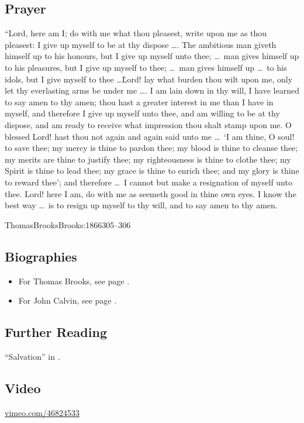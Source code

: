 \documentclass[00-main.tex]{subfiles}
\begin{document}
\subsection{Prayer}
``Lord, here am I; do with me what thou pleasest, write upon me as thou pleasest: I give up myself to be at thy dispose \dots. The ambitious man giveth himself up to his honours, but I give up myself unto thee; \dots\ man gives himself up to his pleasures, but I give up myself to thee; \dots\ man gives himself up \dots\ to his idols, but I give myself to thee \dots\. Lord! lay what burden thou wilt upon me, only let thy everlasting arms be under me \dots. I am lain down in thy will, I have learned to say amen to thy amen; thou hast a greater interest in me than I have in myself, and therefore I give up myself unto thee, and am willing to be at thy dispose, and am ready to receive what impression thou shalt stamp upon me. O blessed Lord! hast thou not again and again said unto me \dots\ `I am thine, O soul! to save thee; my mercy is thine to pardon thee; my blood is thine to cleanse thee; my merits are thine to justify thee; my righteousness is thine to clothe thee; my Spirit is thine to lead thee; my grace is thine to enrich thee; and my glory is thine to reward thee'; and therefore \dots\ I cannot but make a resignation of myself unto thee. Lord! here I am, do with me as seemeth good in thine own eyes. I know the best way \dots\ is to resign up myself to thy will, and to say amen to thy amen.

\begin{NameCite}{Thomas}{Brooks}{Brooks:1866}{305--306}\end{NameCite}

\begin{multicols*}{2}
\subsection{Biographies}

\begin{itemize}
	\item For Thomas Brooks, see page \pageref{brooks}.
	\item For John Calvin, see page \pageref{calvin}.
\end{itemize}

	\subsection{Further Reading}
	``Salvation'' in \cite{Packer:2001}.

	\subsection{Video}
	\href{https://vimeo.com/46824533}{vimeo.com\slash{}46824533}
\end{multicols*}
\end{document}
